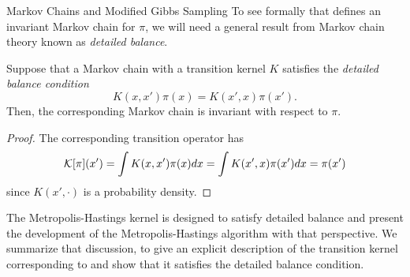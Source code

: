 \begin{chapter}{Markov Chains and Modified Gibbs Sampling}
To see formally that  defines an invariant Markov chain for $\pi$, we will need a general result from Markov chain theory known as \emph{detailed balance}.
\begin{thm}
  Suppose that a Markov chain with a transition kernel $K$ satisfies the \emph{detailed balance condition} 
  \begin{equation} \label{eq:detailedBalance}
    K(x,x')\pi(x) = K(x',x) \pi(x').
  \end{equation}
  Then, the corresponding Markov chain is invariant with respect to $\pi$.
\end{thm}
\begin{proof}
  The corresponding transition operator has
  \begin{equation}
    \mathcal K[\pi](x') = \int K(x,x') \pi(x)dx = \int K(x',x)\pi(x')dx = \pi(x')
  \end{equation}
  since $K(x',\cdot)$ is a probability density.
\end{proof}
The Metropolis-Hastings kernel is designed to satisfy detailed balance and \citep{calvetti2007introduction} present the development of the Metropolis-Hastings algorithm with that perspective.
We summarize that discussion, to give an explicit description of the transition kernel corresponding to  and show that it satisfies the detailed balance condition.


\end{chapter}

